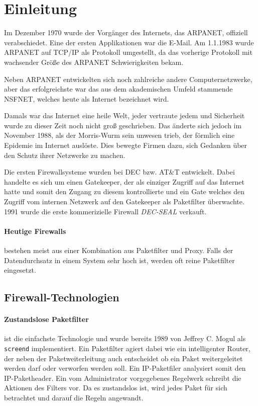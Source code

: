 \section{Einleitung}

Im Dezember 1970 wurde der Vorgänger des Internets, das ARPANET, offiziell
verabschiedet. Eine der ersten Applikationen war die E-Mail.
Am 1.1.1983 wurde ARPANET auf TCP/IP als Protokoll umgestellt,
da das vorherige Protokoll mit wachsender Größe des ARPANET Schwierigkeiten
bekam.

Neben ARPANET entwickelten sich noch zahlreiche andere Computernetzwerke,
aber das erfolgreichste war das aus dem akademischen Umfeld stammende NSFNET,
welches heute als Internet bezeichnet wird.

Damals war das Internet eine heile Welt, jeder vertraute jedem und Sicherheit
wurde zu dieser Zeit noch nicht groß geschrieben.
Das änderte sich jedoch im November 1988, als der Morris-Wurm sein unwesen
trieb, der förmlich eine Epidemie im Internet auslöste. Dies bewegte Firmen
dazu, sich Gedanken über den Schutz ihrer Netzwerke zu machen.

Die ersten Firewallsysteme wurden bei DEC bzw. AT\&T entwickelt. Dabei handelte
es sich um einen Gatekeeper, der als einziger Zugriff auf das Internet hatte
und somit den Zugang zu diesem kontrollierte und ein Gate welches den Zugriff
vom internen Netzwerk auf den Gatekeeper als Paketfilter überwachte.
1991 wurde die erste kommerizielle Firewall \emph{DEC-SEAL} verkauft.\cite{iptables}

\paragraph{Heutige Firewalls} bestehen meist aus einer Kombination aus
Paketfilter und Proxy. Falls der Datendurchsatz in einem System sehr
hoch ist, werden oft reine Paketfilter eingesetzt.\cite{iptables}


\subsection{Firewall-Technologien}\label{sec.fw-tec}

\paragraph{Zustandslose Paketfilter} ist die einfachste Technologie und
wurde bereits 1989 von Jeffrey C. Mogul als {\tt screend} implementiert.
Ein Paketfilter agiert dabei wie ein intelligenter Router, der
neben der Paketweiterleitung auch entscheidet ob ein Paket
weitergeleitet werden darf oder verworfen werden soll.
Ein IP-Paketfiler analysiert somit den IP-Paketheader.
Ein vom Administrator vorgegebenes Regelwerk schreibt die Aktionen
des Filters vor. Da es zustandslos ist, wird jedes Paket für sich
betrachtet und darauf die Regeln angewandt.\cite{iptables}

